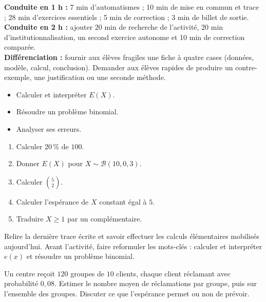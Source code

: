 \ifprof
\begin{methode}
\textbf{Conduite en 1 h :} 7 min d'automatismes ; 10 min de mise en commun et trace ; 28 min d'exercices essentiels ; 5 min de correction ; 3 min de billet de sortie.\\
\textbf{Conduite en 2 h :} ajouter 20 min de recherche de l'activité, 20 min d'institutionnalisation, un second exercice autonome et 10 min de correction comparée.\\
\textbf{Différenciation :} fournir aux élèves fragiles une fiche à quatre cases (données, modèle, calcul, conclusion). Demander aux élèves rapides de produire un contre-exemple, une justification ou une seconde méthode.
\end{methode}
\fi
{}
\begin{objectifs}\begin{itemize}\item Calculer et interpréter $E(X)$.\item Résoudre un problème binomial.\item Analyser ses erreurs.\end{itemize}\end{objectifs}
\begin{automatismes}\begin{enumerate}\item Calculer $20\,\%$ de $100$. \item Donner $E(X)$ pour $X\sim\mathcal B(10,0{,}3)$. \item Calculer $\binom52$. \item Calculer l'espérance de $X$ constant égal à $5$. \item Traduire $X\geq1$ par un complémentaire. \end{enumerate}\end{automatismes}
\begin{prerequis}Relire la dernière trace écrite et savoir effectuer les calculs élémentaires mobilisés aujourd'hui. Avant l'activité, faire reformuler les mots-clés : calculer et interpréter $e(x)$ et résoudre un problème binomial.\end{prerequis}

\begin{activite}
Un centre reçoit $120$ groupes de $10$ clients, chaque client réclamant avec probabilité $0{,}08$. Estimer le nombre moyen de réclamations par groupe, puis sur l'ensemble des groupes. Discuter ce que l'espérance permet ou non de prévoir.

\end{activite}

